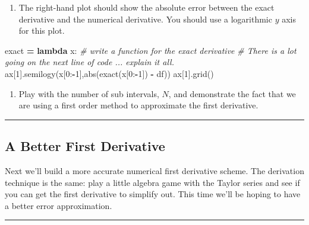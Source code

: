 \documentclass[
]{book}
\newenvironment{Shaded}{\begin{snugshade}}{\end{snugshade}}
\newcommand{\BuiltInTok}[1]{#1}
\newcommand{\CommentTok}[1]{\textcolor[rgb]{0.56,0.35,0.01}{\textit{#1}}}
\newcommand{\DecValTok}[1]{\textcolor[rgb]{0.00,0.00,0.81}{#1}}
\newcommand{\KeywordTok}[1]{\textcolor[rgb]{0.13,0.29,0.53}{\textbf{#1}}}
\newcommand{\NormalTok}[1]{#1}
\newcommand{\OperatorTok}[1]{\textcolor[rgb]{0.81,0.36,0.00}{\textbf{#1}}}
\providecommand{\tightlist}{%
  \setlength{\itemsep}{0pt}\setlength{\parskip}{0pt}}
\theoremstyle{definition}
\theoremstyle{definition}
\theoremstyle{definition}
\theoremstyle{remark}
\begin{document}
\begin{enumerate}
\def\labelenumi{\alph{enumi}.}
\setcounter{enumi}{1}
\tightlist
\item
  The right-hand plot should show the absolute error between the exact
  derivative and the numerical derivative. You should use a
  logarithmic \(y\) axis for this plot.
\end{enumerate}

\begin{Shaded}
\begin{Highlighting}[]
\NormalTok{exact }\OperatorTok{=} \KeywordTok{lambda}\NormalTok{ x: }\CommentTok{\# write a function for the exact derivative}
\CommentTok{\# There is a lot going on the next line of code ... explain it all.}
\NormalTok{ax[}\DecValTok{1}\NormalTok{].semilogy(x[}\DecValTok{0}\NormalTok{:}\OperatorTok{{-}}\DecValTok{1}\NormalTok{],}\BuiltInTok{abs}\NormalTok{(exact(x[}\DecValTok{0}\NormalTok{:}\OperatorTok{{-}}\DecValTok{1}\NormalTok{]) }\OperatorTok{{-}}\NormalTok{ df))}
\NormalTok{ax[}\DecValTok{1}\NormalTok{].grid()}
\end{Highlighting}
\end{Shaded}

\begin{enumerate}
\def\labelenumi{\alph{enumi}.}
\setcounter{enumi}{2}
\tightlist
\item
  Play with the number of sub intervals, \(N\), and demonstrate the fact that we are using a first order method to approximate the first derivative.
\end{enumerate}

\begin{center}\rule{0.5\linewidth}{0.5pt}\end{center}

\hypertarget{a-better-first-derivative}{%
\subsection{A Better First Derivative}\label{a-better-first-derivative}}

Next we'll build a more accurate numerical first derivative scheme. The derivation technique is the same: play a little algebra game with the Taylor series and see if you can get the first derivative to simplify out. This time we'll be hoping to have a better error approximation.

\begin{center}\rule{0.5\linewidth}{0.5pt}\end{center}
\end{document}

